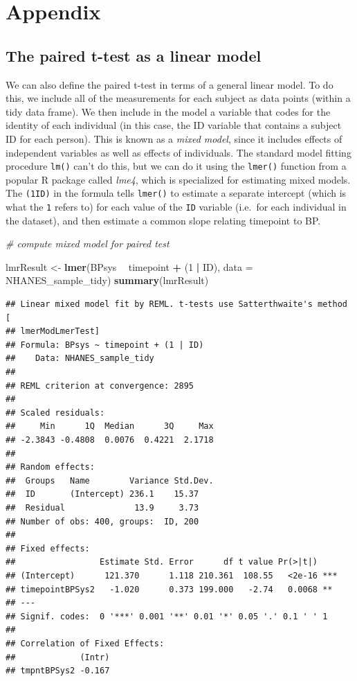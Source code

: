 \documentclass[12pt,]{book}
\newenvironment{Shaded}{\begin{snugshade}}{\end{snugshade}}
\newcommand{\CommentTok}[1]{\textcolor[rgb]{0.56,0.35,0.01}{\textit{#1}}}
\newcommand{\DataTypeTok}[1]{\textcolor[rgb]{0.13,0.29,0.53}{#1}}
\newcommand{\DecValTok}[1]{\textcolor[rgb]{0.00,0.00,0.81}{#1}}
\newcommand{\KeywordTok}[1]{\textcolor[rgb]{0.13,0.29,0.53}{\textbf{#1}}}
\newcommand{\NormalTok}[1]{#1}
\newcommand{\OperatorTok}[1]{\textcolor[rgb]{0.81,0.36,0.00}{\textbf{#1}}}
\newcommand{\StringTok}[1]{\textcolor[rgb]{0.31,0.60,0.02}{#1}}
\theoremstyle{definition}
\theoremstyle{definition}
\theoremstyle{definition}
\theoremstyle{remark}
\begin{document}
\hypertarget{appendix-6}{%
\section{Appendix}\label{appendix-6}}

\hypertarget{the-paired-t-test-as-a-linear-model}{%
\subsection{The paired t-test as a linear model}\label{the-paired-t-test-as-a-linear-model}}

We can also define the paired t-test in terms of a general linear model. To do this, we include all of the measurements for each subject as data points (within a tidy data frame). We then include in the model a variable that codes for the identity of each individual (in this case, the ID variable that contains a subject ID for each person). This is known as a \emph{mixed model}, since it includes effects of independent variables as well as effects of individuals. The standard model fitting procedure \texttt{lm()} can't do this, but we can do it using the \texttt{lmer()} function from a popular R package called \emph{lme4}, which is specialized for estimating mixed models. The \texttt{(1\textbar{}ID)} in the formula tells \texttt{lmer()} to estimate a separate intercept (which is what the \texttt{1} refers to) for each value of the \texttt{ID} variable (i.e.~for each individual in the dataset), and then estimate a common slope relating timepoint to BP.

\begin{Shaded}
\begin{Highlighting}[]
\CommentTok{# compute mixed model for paired test}

\NormalTok{lmrResult <-}\StringTok{ }\KeywordTok{lmer}\NormalTok{(BPsys }\OperatorTok{~}\StringTok{ }\NormalTok{timepoint }\OperatorTok{+}\StringTok{ }\NormalTok{(}\DecValTok{1} \OperatorTok{|}\StringTok{ }\NormalTok{ID), }
                  \DataTypeTok{data =}\NormalTok{ NHANES_sample_tidy)}
\KeywordTok{summary}\NormalTok{(lmrResult)}
\end{Highlighting}
\end{Shaded}

\begin{verbatim}
## Linear mixed model fit by REML. t-tests use Satterthwaite's method [
## lmerModLmerTest]
## Formula: BPsys ~ timepoint + (1 | ID)
##    Data: NHANES_sample_tidy
## 
## REML criterion at convergence: 2895
## 
## Scaled residuals: 
##     Min      1Q  Median      3Q     Max 
## -2.3843 -0.4808  0.0076  0.4221  2.1718 
## 
## Random effects:
##  Groups   Name        Variance Std.Dev.
##  ID       (Intercept) 236.1    15.37   
##  Residual              13.9     3.73   
## Number of obs: 400, groups:  ID, 200
## 
## Fixed effects:
##                 Estimate Std. Error      df t value Pr(>|t|)    
## (Intercept)      121.370      1.118 210.361  108.55   <2e-16 ***
## timepointBPSys2   -1.020      0.373 199.000   -2.74   0.0068 ** 
## ---
## Signif. codes:  0 '***' 0.001 '**' 0.01 '*' 0.05 '.' 0.1 ' ' 1
## 
## Correlation of Fixed Effects:
##             (Intr)
## tmpntBPSys2 -0.167
\end{verbatim}
\end{document}
